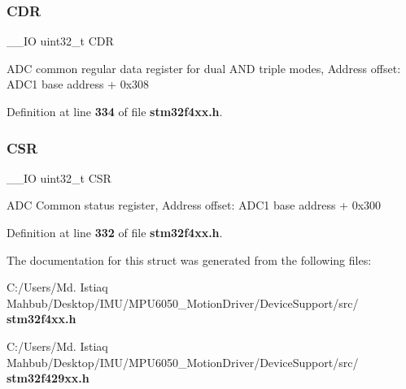 \subsubsection{C\+DR}
{\footnotesize\ttfamily \+\_\+\+\_\+\+IO uint32\+\_\+t C\+DR}

A\+DC common regular data register for dual A\+ND triple modes, Address offset\+: A\+D\+C1 base address + 0x308 

Definition at line \textbf{ 334} of file \textbf{ stm32f4xx.\+h}.

\mbox{\label{structADC__Common__TypeDef_a876dd0a8546697065f406b7543e27af2}} 
\subsubsection{C\+SR}
{\footnotesize\ttfamily \+\_\+\+\_\+\+IO uint32\+\_\+t C\+SR}

A\+DC Common status register, Address offset\+: A\+D\+C1 base address + 0x300 

Definition at line \textbf{ 332} of file \textbf{ stm32f4xx.\+h}.



The documentation for this struct was generated from the following files\+:\begin{DoxyCompactItemize}
\item 
C\+:/\+Users/\+Md. Istiaq Mahbub/\+Desktop/\+I\+M\+U/\+M\+P\+U6050\+\_\+\+Motion\+Driver/\+Device\+Support/src/\textbf{ stm32f4xx.\+h}\item 
C\+:/\+Users/\+Md. Istiaq Mahbub/\+Desktop/\+I\+M\+U/\+M\+P\+U6050\+\_\+\+Motion\+Driver/\+Device\+Support/src/\textbf{ stm32f429xx.\+h}\end{DoxyCompactItemize}

